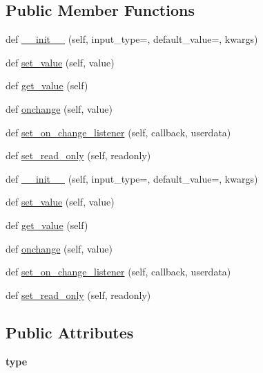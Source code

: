 \subsection*{Public Member Functions}
\begin{DoxyCompactItemize}
\item 
def \hyperlink{classremi_1_1gui_1_1Input_a7fbd2240680a6a5851b3e6cb4803c702}{\+\_\+\+\_\+init\+\_\+\+\_\+} (self, input\+\_\+type=\textquotesingle{}\textquotesingle{}, default\+\_\+value=\textquotesingle{}\textquotesingle{}, kwargs)
\item 
def \hyperlink{classremi_1_1gui_1_1Input_adf726194a728fbf42b1e3a5832ac39f0}{set\+\_\+value} (self, value)
\item 
def \hyperlink{classremi_1_1gui_1_1Input_ae70594dc1113bb42e74ee2d20ae27896}{get\+\_\+value} (self)
\item 
def \hyperlink{classremi_1_1gui_1_1Input_a05ed9a1c3dcd85ae8b3eb1216b2a6a6a}{onchange} (self, value)
\item 
def \hyperlink{classremi_1_1gui_1_1Input_a094ee901b2fa3915b4c68e2ab40d4bca}{set\+\_\+on\+\_\+change\+\_\+listener} (self, callback, userdata)
\item 
def \hyperlink{classremi_1_1gui_1_1Input_afe721e53146ce0a36f77452fe4d22f6b}{set\+\_\+read\+\_\+only} (self, readonly)
\item 
def \hyperlink{classremi_1_1gui_1_1Input_a7fbd2240680a6a5851b3e6cb4803c702}{\+\_\+\+\_\+init\+\_\+\+\_\+} (self, input\+\_\+type=\textquotesingle{}\textquotesingle{}, default\+\_\+value=\textquotesingle{}\textquotesingle{}, kwargs)
\item 
def \hyperlink{classremi_1_1gui_1_1Input_adf726194a728fbf42b1e3a5832ac39f0}{set\+\_\+value} (self, value)
\item 
def \hyperlink{classremi_1_1gui_1_1Input_ae70594dc1113bb42e74ee2d20ae27896}{get\+\_\+value} (self)
\item 
def \hyperlink{classremi_1_1gui_1_1Input_a05ed9a1c3dcd85ae8b3eb1216b2a6a6a}{onchange} (self, value)
\item 
def \hyperlink{classremi_1_1gui_1_1Input_a094ee901b2fa3915b4c68e2ab40d4bca}{set\+\_\+on\+\_\+change\+\_\+listener} (self, callback, userdata)
\item 
def \hyperlink{classremi_1_1gui_1_1Input_afe721e53146ce0a36f77452fe4d22f6b}{set\+\_\+read\+\_\+only} (self, readonly)
\end{DoxyCompactItemize}
\subsection*{Public Attributes}
\begin{DoxyCompactItemize}
\item 
{\bfseries type}\hypertarget{classremi_1_1gui_1_1Input_a77c5b2fea1826a5237e8d24645182343}{}\label{classremi_1_1gui_1_1Input_a77c5b2fea1826a5237e8d24645182343}

\end{DoxyCompactItemize}
